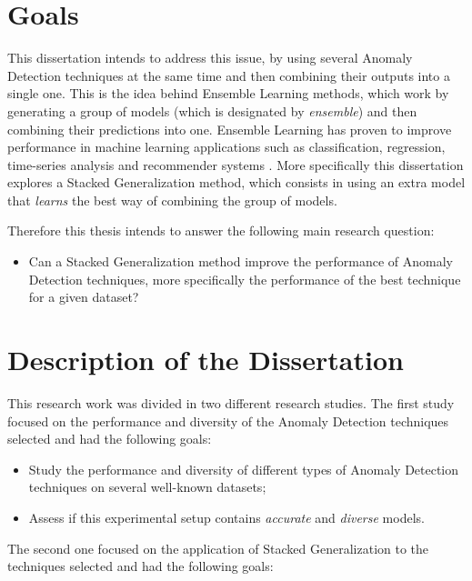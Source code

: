 \documentclass[9pt,a4paper]{extarticle}
\begin{document}
\begin{multicols}{2}
\section{Goals}\label{sec:goals}

This dissertation intends to address this issue, by using several Anomaly Detection techniques at the same time and then combining their outputs into a single one.
This is the idea behind Ensemble Learning methods, which work by generating a group of models (which is designated by \textit{ensemble}) and then combining their predictions into one.
Ensemble Learning has proven to improve performance in machine learning applications such as classification, regression, time-series analysis and recommender systems \cite{Aggarwal:2013:OA:2436823}.
More specifically this dissertation explores a Stacked Generalization method, which consists in using an extra model that \textit{learns} the best way of combining the group of models.

Therefore this thesis intends to answer the following main research question:

\begin{itemize}
	\item Can a Stacked Generalization method improve the performance of Anomaly Detection techniques, more specifically the performance of the best technique for a given dataset?
\end{itemize}


\section{Description of the Dissertation}\label{sec:work}

This research work was divided in two different research studies.
The first study focused on the performance and diversity of the Anomaly Detection techniques selected and had the following goals:

\begin{itemize}
	\item Study the performance and diversity of different types of Anomaly Detection techniques on
	several well-known datasets;
	\item Assess if this experimental setup contains \textit{accurate} and \textit{diverse} models.
\end{itemize}

The second one focused on the application of Stacked Generalization to the techniques selected and had the following goals:


\end{multicols}
\end{document}
